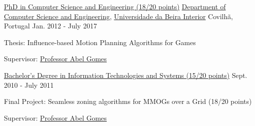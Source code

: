 

\begin{cventries}

  \cventry
    {\href{https://www.ubi.pt/en/course/849}{PhD in Computer Science and Engineering (18/20 points)}} %
    {\href{https://www.di.ubi.pt/}{Department of Computer Science and Engineering}, \href{http://www.ubi.pt/}{Universidade da Beira Interior}} %
    {Covilh\~{a}, Portugal} %
    {Jan. 2012 - July 2017} %
    {
      \begin{cvitems} %
        \item {Thesis: Influence-based Motion Planning Algorithms for Games}
        \item {Supervisor: \href{http://www.di.ubi.pt/~agomes/}{Professor Abel Gomes}}
      \end{cvitems}
    }

  \cventry
    {\href{https://www.ubi.pt/en/course/64}{Bachelor's Degree in Information Technologies and Systems (15/20 points)}} %
    {} %
    {} %
    {Sept. 2010 - July 2011} %
    {
      \begin{cvitems} %
        \item {Final Project: Seamless zoning algorithms for MMOGs over a Grid (18/20 points)}
		\item {Supervisor: \href{http://www.di.ubi.pt/~agomes/}{Professor Abel Gomes}}
      \end{cvitems}
    }
  

\end{cventries}
